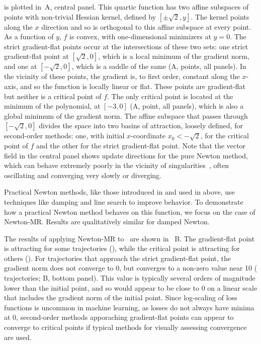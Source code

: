 \documentclass[../../thesis.tex]{subfiles}
\begin{document}
 is plotted in~A,
central panel.
This quartic function has two affine subspaces
of points with non-trivial Hessian kernel,
defined by $[\pm\sqrt{2}, y]$.
The kernel points along the $x$ direction and so
is orthogonal to this affine subspace at every point.
As a function of $y$, $f$ is convex,
with one-dimensional minimizers at $y=0$.
The strict gradient-flat points occur at the intersections
of these two sets:
one strict gradient-flat point at $[\sqrt{2}, 0]$,
which is a local minimum of the gradient norm,
and one at $[-\sqrt{2}, 0]$,
which is a saddle of the same
(A, \failcolor{} points, all panels).
In the vicinity of these points, the gradient is,
to first order, constant along the $x$-axis,
and so the function is locally linear or flat.
These points are gradient-flat but
neither is a critical point of $f$.
The only critical point is located at the minimum of the polynomial,
at $[-3, 0]$
(A, \successcolor{} point, all panels),
which is also a global minimum of the gradient norm.
The affine subspace that passes through
$[-\sqrt{2}, 0]$ divides the space into two
basins of attraction, loosely defined,
for second-order methods:
one, with initial $x$-coordinate $x_0<-\sqrt{2}$,
for the critical point of $f$
and the other for the strict gradient-flat point.
Note that the vector field in the central panel shows update directions
for the pure Newton method,
which can behave extremely poorly in the vicinity
of singularities~\cite{powell1970,griewank1983},
often oscillating and converging very slowly
or diverging.

Practical Newton methods,
like those introduced in 
and used in  above,
use techniques like
damping and line search to improve behavior.
To demonstrate how a practical Newton method
behaves on this function,
we focus on the case of Newton-MR\@.
Results are qualitatively similar for damped Newton.

The results of applying Newton-MR
to~ are shown in%
~B.
The gradient-flat point is attracting
for some trajectories
(\failcolor{}),
while the critical point is attracting for others
(\successcolor{}).
For trajectories that approach the strict gradient-flat point,
the gradient norm does not converge to 0,
but converges to a non-zero value near 10
(\failcolor{} trajectories; B, bottom panel).
This value is typically several orders of magnitude lower
than the initial point, and so would appear to be close to 0
on a linear scale that includes the gradient norm of the initial point.
Since log-scaling of loss functions is uncommon in machine learning,
as losses do not always have minima at 0,
second-order methods apporaching gradient-flat points
can appear to converge to critical points
if typical methods for visually assessing convergence are used.
\end{document}
